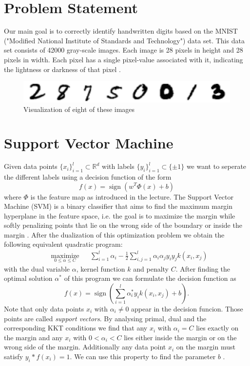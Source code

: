 \documentclass[12pt, a4paper, openany, bibliography=totoc]{report} %
\theoremstyle{definition}
\numberwithin{equation}{chapter}
\newcommand{\R}{\mathbb{R}} %
\DeclareMathOperator{\sign}{sign}
\begin{document}
\cleardoublepage
  \pagestyle{plain}

\chapter*{Problem Statement}
Our main goal is to correctly identify handwritten digits based on the MNIST  ("Modified National Institute of Standards and Technology") data set.
This data set consists of 42000 gray-scale images. Each image is 28 pixels in height and 28 pixels in width. Each pixel has a single pixel-value associated with it, indicating the lightness or darkness of that pixel \cite{kaggel}.

\begin{figure}[h]
	\includegraphics[width=1\textwidth, center]{Digits2}
	\caption{Visualization of eight of these images}
\end{figure}




\chapter*{Support Vector Machine}
Given data points $\{x_i\}_{i=1}^l \subset \R^d$ with labels $\{y_i\}_{i=1}^l \subset \{\pm 1\}$ we want to seperate the different labels using a decision function of the form
$$f(x) = \sign\left(w^T\Phi(x) + b\right)$$ where $\Phi$ is the feature map as introduced in the lecture.
The Support Vector Machine (SVM) is a binary classifier that aims to find the maximum margin hyperplane in the feature space, i.e. the goal is to maximize the margin while softly penalizing points that lie on the wrong side of the boundary or inside the margin \cite{Bishop2006}. After the  dualization of this optimization problem we obtain the following equivalent quadratic program:
\begin{equation*}
\begin{aligned}
& \underset{0 \leq \alpha \leq C}{\text{maximize}}
& & \sum_{i = 1}^{l}\alpha_i - \frac{1}{2} \sum_{i, j = 1}^{l}\alpha_i  \alpha_j y_i y_j k(x_i, x_j)
\end{aligned}
\end{equation*}
with the dual variable $\alpha$, kernel function $k$ and penalty $C$.
After finding the optimal solution $\alpha^*$ of this program we can formulate the decision function as
$$f(x) = \sign\left(\sum_{i=1}^{l}\alpha^*_i y_i k(x_i,x_j)+b\right).$$
Note that only data points $x_i$ with $\alpha_i \neq 0$ appear in the decision funcion. Those points are called \textit{support vectors}. By analysing primal, dual and the corresponding KKT conditions we find that any $x_i$ with $\alpha_i = C$ lies exactly on the margin and any $x_i$ with $0<\alpha_i < C$ lies either inside the margin or on the wrong side of the margin. Additionally any data point $x_i$ on the margin must satisfy $y_i*f(x_i) = 1$. We can use this property to find the parameter $b$ \cite{Bishop2006}.
\end{document}
